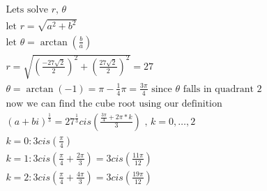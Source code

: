\begin{equation}
    \begin{split}
        \text{Lets solve $r$, $\theta$} \\
        \text{let $r=\sqrt{a^2+b^2}$} \\
        \text{let $\theta=\arctan\left(\frac{b}{a}\right)$} \\
        r = \sqrt{(\frac{-27\sqrt{2}}{2})^2+(\frac{27\sqrt{2}}{2})^2} = 27\\
        \theta = \arctan(-1) = \pi-\frac{1}{4}\pi = \frac{3\pi}{4} \text{ since $\theta$ falls in quadrant 2} \\
        \text{now we can find the cube root using our definition} \\        
        (a+bi)^{\frac{1}{3}}= 27^{\frac{1}{3}}cis{(\frac{\frac{3\pi}{4}+2\pi*k}{3})} \text{ , } k=0,\ldots,2 \\
        k=0 : 3cis{(\frac{\pi}{4})} \\
        k=1 : 3cis{(\frac{\pi}{4}+\frac{2\pi}{3})} = 3cis{(\frac{11\pi}{12})} \\
        k=2 : 3cis{(\frac{\pi}{4}+\frac{4\pi}{3})} = 3cis{(\frac{19\pi}{12})} \\        
    \end{split}
\end{equation}
